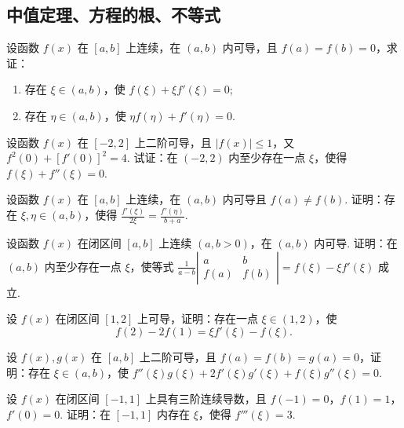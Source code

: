 \subsection{中值定理、方程的根、不等式}

	\begin{ti}
		设函数 $f(x)$ 在 $[a,b]$ 上连续，在 $(a,b)$ 内可导，且 $f(a) = f(b) = 0$，求证：
		\begin{enumerate}
			\item 存在 $\xi \in (a,b)$，使 $f(\xi) + \xi f'(\xi) = 0$;
			\item 存在 $\eta \in (a,b)$，使 $\eta f(\eta) + f'(\eta) = 0$.
		\end{enumerate}
	\end{ti}

	\begin{ti}
		设函数 $f(x)$ 在 $[-2,2]$ 上二阶可导，且 $\left| f(x) \right| \leq 1$，又 $f^{2}(0) + \left[ f'(0) \right]^{2} = 4$. 试证：在 $(-2,2)$ 内至少存在一点 $\xi$，使得 $f(\xi) + f''(\xi) = 0$.
	\end{ti}

	\begin{ti}
		设函数 $f(x)$ 在 $[a,b]$ 上连续，在 $(a,b)$ 内可导且 $f(a) \ne f(b)$. 证明：存在 $\xi,\eta \in (a,b)$，使得 $\frac{f'(\xi)}{2\xi} = \frac{f'(\eta)}{b + a}$.
	\end{ti}

	\begin{ti}
		设函数 $f(x)$ 在闭区间 $[a,b]$ 上连续 $(a,b > 0)$，在 $(a,b)$ 内可导. 证明：在 $(a,b)$ 内至少存在一点 $\xi$，使等式 $\frac{1}{a - b} \left| \begin{smallmatrix}
			a & b\\
			f(a) & f(b)
		\end{smallmatrix} \right| = f(\xi) - \xi f'(\xi)$ 成立.
	\end{ti}

	\begin{ti}
		设 $f(x)$ 在闭区间 $[1,2]$ 上可导，证明：存在一点 $\xi \in (1,2)$，使
		\[
			f(2) - 2f(1) = \xi f'(\xi) - f(\xi).
		\]
	\end{ti}

	\begin{ti}
		设 $f(x), g(x)$ 在 $[a,b]$ 上二阶可导，且 $f(a) = f(b) = g(a) = 0$，证明：存在 $\xi \in (a,b)$，使 $f''(\xi) g(\xi) + 2 f'(\xi) g'(\xi) + f(\xi) g''(\xi) = 0$.
	\end{ti}

	\begin{ti}
		设 $f(x)$ 在闭区间 $[-1,1]$ 上具有三阶连续导数，且 $f(-1) = 0$，$f(1) = 1$，$f'(0) = 0$. 证明：在 $[-1,1]$ 内存在 $\xi$，使得 $f'''(\xi) = 3$.
	\end{ti}

